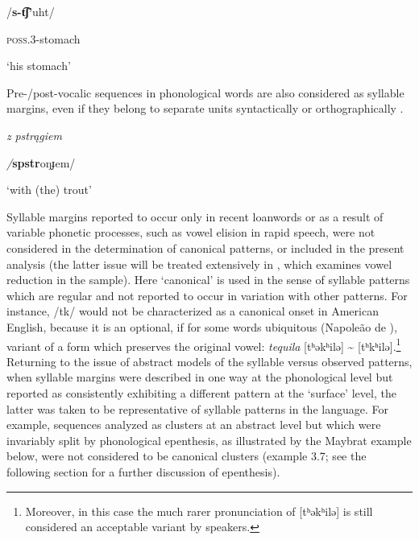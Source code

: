 \ea\label{ex:(3.5)}

/\textbf{s-t͡ʃ’}uht/

\textsc{poss.3}-stomach

\glt ‘his stomach’

\citep[24]{Polian2006}
\z

Pre-/post-vocalic sequences in phonological words are also considered as syllable margins, even if they belong to separate units syntactically or orthographically .

\ea\label{ex:(3.6)}

\textit{z} \textit{pstrągiem}

\textit{/}\textbf{spstr}oŋɟem/

\glt ‘with (the) trout’

\citep[103]{Jassem2003}

\z

  Syllable margins reported to occur only in recent loanwords or as a result of variable phonetic processes, such as vowel elision in rapid speech, were not considered in the determination of canonical patterns, or included in the present analysis (the latter issue will be treated extensively in , which examines vowel reduction in the sample). Here ‘canonical’ is used in the sense of syllable patterns which are regular and not reported to occur in variation with other patterns. For instance, /tk/ would not be characterized as a canonical onset in American English, because it is an optional, if for some words ubiquitous (Napoleão de \citealt{Souza2019}), variant of a form which preserves the original vowel: \textit{tequila} [tʰəkʰilə] {\textasciitilde} [tʰkʰilə].\footnote{ \textrm{Moreover, in this case the much rarer pronunciation of [tʰəkʰilə] is still considered an acceptable variant by speakers.}} Returning to the issue of abstract models of the syllable versus observed patterns, when syllable margins were described in one way at the phonological level but reported as consistently exhibiting a different pattern at the ‘surface’ level, the latter was taken to be representative of syllable patterns in the language. For example, sequences analyzed as clusters at an abstract level but which were invariably split by phonological epenthesis, as illustrated by the Maybrat example below, were not considered to be canonical clusters (example 3.7; see the following section for a further discussion of epenthesis).

\ea\label{ex:(3.7)}

